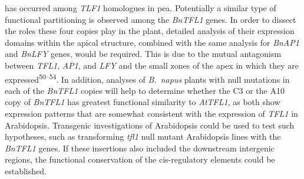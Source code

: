 \documentclass[12pt,]{book}
\begin{document}
has occurred among \emph{TLF1} homologues in pea. Potentially a similar
type of functional partitioning is observed among the \emph{BnTFL1}
genes. In order to dissect the roles these four copies play in the
plant, detailed analysis of their expression domains within the apical
structure, combined with the same analysis for \emph{BnAP1} and
\emph{BnLFY} genes, would be required. This is due to the mutual
antagonism between \emph{TFL1}, \emph{AP1}, and \emph{LFY} and the small
zones of the apex in which they are expressed\textsuperscript{50--54}.
In addition, analyses of \emph{B.~napus} plants with null mutations in
each of the \emph{BnTFL1} copies will help to determine whether the C3
or the A10 copy of \emph{BnTFL1} has greatest functional similarity to
\emph{AtTFL1}, as both show expression patterns that are somewhat
consistent with the expression of \emph{TFL1} in Arabidopsis. Transgenic
investigations of Arabidopsis could be used to test such hypotheses,
such as transforming \emph{tfl1} null mutant Arabidopsis lines with the
\emph{BnTFL1} genes. If these insertions also included the downstream
intergenic regions, the functional conservation of the cis-regulatory
elements could be established.
\end{document}
